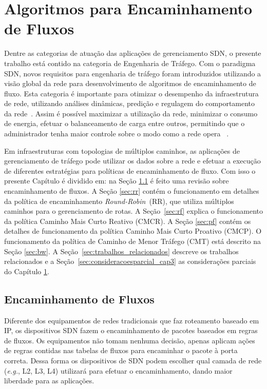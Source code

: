 \chapter{Algoritmos para Encaminhamento de Fluxos }%
\label{cap:algoritimos}
Dentre as categorias de atuação das aplicações  de gerenciamento SDN, o presente trabalho está contido na categoria de Engenharia de Tráfego. Com o paradigma SDN, novos requisitos para engenharia de tráfego foram introduzidos utilizando a visão global da rede para desenvolvimento de algoritmos de encaminhamento de fluxo. Esta categoria é importante para otimizar o desempenho da infraestrutura de rede, utilizando análises dinâmicas, predição e regulagem do comportamento da rede~\cite{akyildiz2014roadmap}. Assim é possível maximizar a utilização da rede, minimizar o consumo de energia, efetuar o balanceamento de carga entre outros, permitindo que o administrador tenha maior controle sobre o modo como a rede opera ~\cite{minicurso216}. 

Em infraestruturas com topologias de múltiplos caminhos, as aplicações de gerenciamento de tráfego pode utilizar os dados sobre a rede e efetuar a execução de diferentes estratégias para políticas de encaminhamento de fluxo.
Com isso o presente Capítulo é dividido em: na Seção \ref{sec:encaminhamento} é feito uma revisão sobre encaminhamento de fluxos. A Seção \ref{sec:rr} contém o funcionamento em detalhes da política de encaminhamento \textit{Round-Robin}~(RR), que utiliza múltiplos caminhos para o gerenciamento de rotas. A Seção~\ref{sec:rf} explica o funcionamento da política Caminho Mais Curto Reativo (CMCR). A Seção \ref{sec:pf} contém os detalhes de funcionamento da política Caminho Mais Curto Proativo (CMCP). O funcionamento da política de Caminho de Menor Tráfego (CMT) está descrito na Seção \ref{sec:bw}. A Seção~\ref{sec:trabalhos_relacionados} descreve os trabalhos relacionados e a Seção~\ref{sec:consideracoesparcial_cap3} as considerações parciais do Capítulo \ref{cap:algoritimos}.

\section{Encaminhamento de Fluxos}
\label{sec:encaminhamento}

Diferente dos equipamentos de redes tradicionais que faz roteamento baseado em IP, os dispositivos SDN fazem o encaminhamento de pacotes baseados em regras de fluxos. Os equipamentos não tomam nenhuma decisão, apenas aplicam ações de regras contidas nas tabelas de fluxos para encaminhar o pacote à porta correta. Dessa forma os dispositivos de SDN podem escolher qual camada de rede (\textit{e.g.}, L2, L3, L4) utilizará para efetuar o encaminhamento, dando maior liberdade para as aplicações. 

